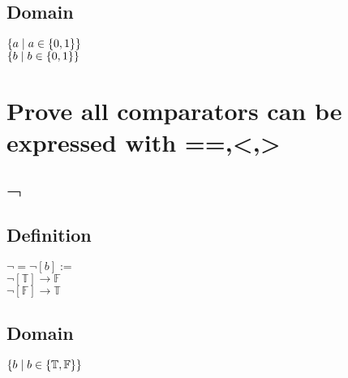 \documentclass[11pt]{article}
\begin{document}
\subsection{Domain}
\begin{center}
$
\{ a \hspace{1mm}| \hspace{1mm} a \in \{0,1\} \}
$
\\ \vspace{2mm}
$
\{ b \hspace{1mm}| \hspace{1mm} b \in \{0,1\} \}
$
\end{center}



\section{Prove all comparators can be expressed with ==,<,>}






\newpage
\section{$\lnot$}
\subsection{Definition}
\begin{center}
$
\lnot = \lnot[b] :=
$
\\ \vspace{2mm}
$
 \lnot[\mathbb{T}] \rightarrow \mathbb{F}
 $
 \\ \vspace{2mm}
 $
 \lnot[\mathbb{F}] \rightarrow \mathbb{T}
$
\end{center}
\subsection{Domain}
\begin{center}
$
\{ b \hspace{1mm}| \hspace{1mm} b \in \{\mathbb{T}, \mathbb{F}\}\}
$
\end{center}
\end{document}
